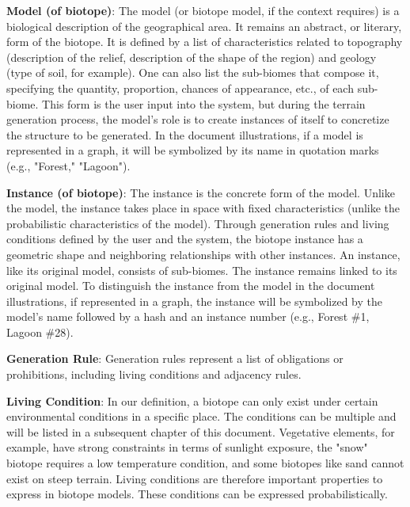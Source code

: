\textbf{Model (of biotope)}: The model (or biotope model, if the context requires) is a biological description of the geographical area. It remains an abstract, or literary, form of the biotope. It is defined by a list of characteristics related to topography (description of the relief, description of the shape of the region) and geology (type of soil, for example). One can also list the sub-biomes that compose it, specifying the quantity, proportion, chances of appearance, etc., of each sub-biome. This form is the user input into the system, but during the terrain generation process, the model's role is to create instances of itself to concretize the structure to be generated. In the document illustrations, if a model is represented in a graph, it will be symbolized by its name in quotation marks (e.g., "Forest," "Lagoon").

\textbf{Instance (of biotope)}: The instance is the concrete form of the model. Unlike the model, the instance takes place in space with fixed characteristics (unlike the probabilistic characteristics of the model). Through generation rules and living conditions defined by the user and the system, the biotope instance has a geometric shape and neighboring relationships with other instances. An instance, like its original model, consists of sub-biomes. The instance remains linked to its original model. To distinguish the instance from the model in the document illustrations, if represented in a graph, the instance will be symbolized by the model's name followed by a hash and an instance number (e.g., Forest \#1, Lagoon \#28).

\textbf{Generation Rule}: Generation rules represent a list of obligations or prohibitions, including living conditions and adjacency rules.

\textbf{Living Condition}: In our definition, a biotope can only exist under certain environmental conditions in a specific place. The conditions can be multiple and will be listed in a subsequent chapter of this document. Vegetative elements, for example, have strong constraints in terms of sunlight exposure, the "snow" biotope requires a low temperature condition, and some biotopes like sand cannot exist on steep terrain. Living conditions are therefore important properties to express in biotope models. These conditions can be expressed probabilistically.

